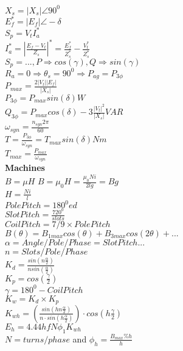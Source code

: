 \documentclass[a4paper, 10pt]{article}
\begin{document}
\begin{paracol}{3}[]
$X_s=|X_s| \angle 90^0$\\
$E_f^*=|E_f| \angle -\delta$\\

$S_p = V_tI_a^*$\\
$I_a^* = |\frac{E_f-V_t}{Z_s}|^* = \frac{E_f^*}{Z_s^*} - \frac{V_t^*}{Z_s^*}$\\

$S_p=..., P\Rightarrow cos(\gamma), Q\Rightarrow sin(\gamma)$\\

$R_a=0 \Rightarrow \theta_s = 90^0 \Rightarrow P_{ag} = P_{3\phi}$\\
$P_{max} = \frac{2|V_t||E_f|}{|X_s|}$\\
$P_{3\phi}=P_{max}sin(\delta) W$\\
$Q_{3\phi}=P_{max}cos(\delta) - 3\frac{|V_t|^2}{|X_s|} VAR$\\

$\omega_{syn} = \frac{n_{syn} 2\pi}{60}$\\
$T=\frac{P_{3\phi}}{\omega_{syn}}=T_{max} sin(\delta) Nm$\\
$T_{max}=\frac{P_{max}}{\omega_{syn}}$\\


\textbf{Machines}\\
$B=\mu H$
$B=\mu_0 H=\frac{\mu_0 Ni}{2lg} = Bg$\\
$H=\frac{Ni}{l}$\\
$PolePitch = 180^0ed$\\
$SlotPitch=\frac{720^0}{slots}$\\
$CoilPitch=7/9 \times PolePitch$\\
$B(\theta)=B_{1max}cos(\theta)+B_{3max}cos(2\theta)+...$\\

$\alpha	= Angle/Pole/Phase = SlotPitch... $\\
$n=Slots/Pole/Phase$\\
$K_d=\frac{sin(n\frac{\alpha}{2})}{n sin(\frac{\alpha}{2})}$\\

$K_p=cos(\frac{\gamma}{2})$\\
$\gamma=180^0-CoilPitch$\\

$K_w = K_d \times K_p$\\
$K_{wh} = (\frac{sin(hn\frac{\alpha}{2})}{n\cdot sin(h\frac{\alpha}{2})}) \cdot cos(h\frac{\gamma}{2})$\\

$E_h = 4.44 h f N \phi_1 K_{wh}$\\
$N = turns/phase$ and $\phi_h=\frac{B_{max}\% h}{h}$\\


\end{paracol}
\end{document}
